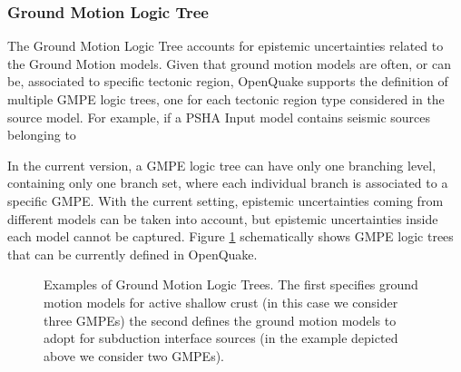 \subsubsection{Ground Motion Logic Tree}
\label{hazard:gmpe_logic_tree}
The Ground Motion Logic Tree accounts for epistemic uncertainties related 
to the Ground Motion models.  
%
Given that ground motion models are often, or can be, associated to 
specific tectonic region,  OpenQuake supports the definition of multiple 
GMPE logic trees, one for each tectonic region type considered in 
the source model. 
% 
For example, if a PSHA Input model contains seismic sources belonging to 


In the current version, a GMPE logic tree can have only one 
branching level, containing only one branch set, where each individual branch 
is associated to a specific GMPE. With the current setting, epistemic 
uncertainties coming from different models can be taken into account, but 
epistemic uncertainties inside each model cannot be captured.
Figure \ref{fig:GMPELogicTree} schematically shows GMPE logic trees that can 
be currently defined in OpenQuake.
\renewcommand{\psedge}{\ncdiag[armA=0,angleB=180,armB=1cm]}
\begin{figure}[!hb]
\centering

\caption{Examples of Ground Motion Logic Trees. The first specifies ground
motion models for active shallow crust (in this case we consider three GMPEs) 
the second defines the ground motion models to adopt for subduction interface 
sources (in the example depicted above we consider two GMPEs).}
\label{fig:GMPELogicTree}
\end{figure}


%
